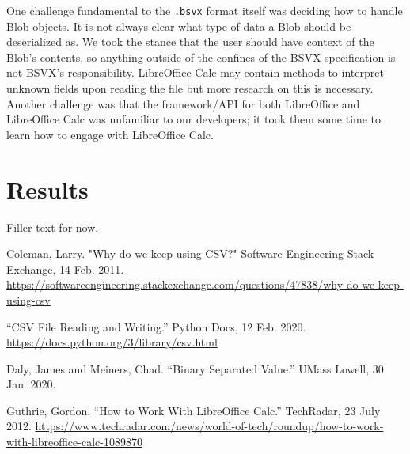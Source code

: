 \documentclass[10pt]{article}
\begin{document}
\indent{}
One challenge fundamental to the \texttt{.bsvx} format itself was deciding how to handle Blob objects.
It is not always clear what type of data a Blob should be deserialized as.
We took the stance that the user should have context of the Blob's contents, so anything outside of the confines of the BSVX specification is not BSVX's responsibility.
LibreOffice Calc may contain methods to interpret unknown fields upon reading the file but more research on this is necessary.
Another challenge was that the framework/API for both LibreOffice and LibreOffice Calc was unfamiliar to our developers; it took them some time to learn how to engage with LibreOffice Calc.

\section*{Results}

Filler text for now.

\clearpage
{}
\printnoidxglossary[nonumberlist]

\clearpage
\begin{thebibliography}{9}

    Coleman, Larry.
    "Why do we keep using CSV?"
    Software Engineering Stack Exchange,
    14 Feb. 2011.
    \url{https://softwareengineering.stackexchange.com/questions/47838/why-do-we-keep-using-csv}

    “CSV File Reading and Writing.”
    Python Docs,
    12 Feb. 2020.
    \url{https://docs.python.org/3/library/csv.html}

    Daly, James and Meiners, Chad.
    “Binary Separated Value.”
    UMass Lowell,
    30 Jan. 2020.

    Guthrie, Gordon.
    “How to Work With LibreOffice Calc.”
    TechRadar,
    23 July 2012.
    \url{https://www.techradar.com/news/world-of-tech/roundup/how-to-work-with-libreoffice-calc-1089870}
  
\end{thebibliography}
\end{document}
